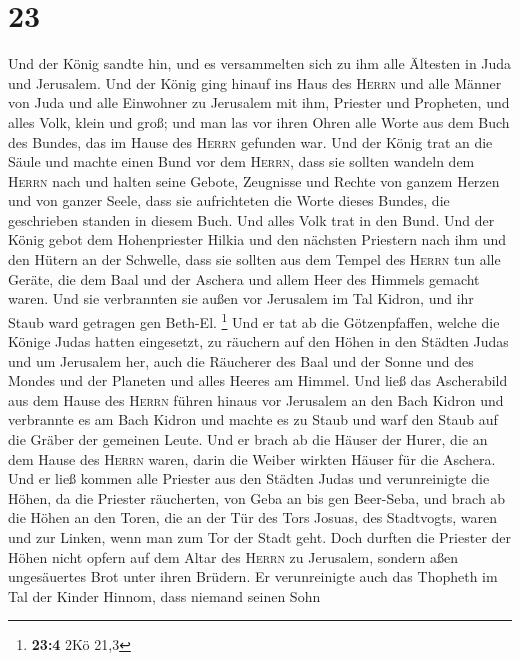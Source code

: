 \hypertarget{section-6}{%
\section{23}\label{section-6}}

 Und der König sandte hin, und es versammelten sich zu ihm
alle Ältesten in Juda und Jerusalem.  Und der König ging
hinauf ins Haus des \textsc{Herrn} und alle Männer von Juda und alle
Einwohner zu Jerusalem mit ihm, Priester und Propheten, und alles Volk,
klein und groß; und man las vor ihren Ohren alle Worte aus dem Buch des
Bundes, das im Hause des \textsc{Herrn} gefunden war.  Und
der König trat an die Säule und machte einen Bund vor dem
\textsc{Herrn}, dass sie sollten wandeln dem \textsc{Herrn} nach und
halten seine Gebote, Zeugnisse und Rechte von ganzem Herzen und von
ganzer Seele, dass sie aufrichteten die Worte dieses Bundes, die
geschrieben standen in diesem Buch. Und alles Volk trat in den Bund.
 Und der König gebot dem Hohenpriester Hilkia und den
nächsten Priestern nach ihm und den Hütern an der Schwelle, dass sie
sollten aus dem Tempel des \textsc{Herrn} tun alle Geräte, die dem Baal
und der Aschera und allem Heer des Himmels gemacht waren. Und sie
verbrannten sie außen vor Jerusalem im Tal Kidron, und ihr Staub ward
getragen gen Beth-El. \footnote{\textbf{23:4} 2Kö 21,3} 
Und er tat ab die Götzenpfaffen, welche die Könige Judas hatten
eingesetzt, zu räuchern auf den Höhen in den Städten Judas und um
Jerusalem her, auch die Räucherer des Baal und der Sonne und des Mondes
und der Planeten und alles Heeres am Himmel.  Und ließ das
Ascherabild aus dem Hause des \textsc{Herrn} führen hinaus vor Jerusalem
an den Bach Kidron und verbrannte es am Bach Kidron und machte es zu
Staub und warf den Staub auf die Gräber der gemeinen Leute.
 Und er brach ab die Häuser der Hurer, die an dem Hause
des \textsc{Herrn} waren, darin die Weiber wirkten Häuser für die
Aschera.  Und er ließ kommen alle Priester aus den Städten
Judas und verunreinigte die Höhen, da die Priester räucherten, von Geba
an bis gen Beer-Seba, und brach ab die Höhen an den Toren, die an der
Tür des Tors Josuas, des Stadtvogts, waren und zur Linken, wenn man zum
Tor der Stadt geht.  Doch durften die Priester der Höhen
nicht opfern auf dem Altar des \textsc{Herrn} zu Jerusalem, sondern aßen
ungesäuertes Brot unter ihren Brüdern.  Er verunreinigte
auch das Thopheth im Tal der Kinder Hinnom, dass niemand seinen Sohn
